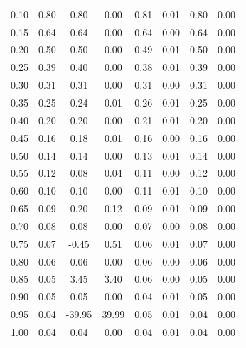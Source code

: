 \documentclass[12pt, a4paper, oneside]{article}
\begin{document}
\begin{longtable}{|c|c||c|c||c|c||c|c|}
    0.10 & 0.80 & 0.80 & 0.00 & 0.81 & 0.01 & 0.80 & 0.00 \\
    0.15 & 0.64 & 0.64 & 0.00 & 0.64 & 0.00 & 0.64 & 0.00 \\
    0.20 & 0.50 & 0.50 & 0.00 & 0.49 & 0.01 & 0.50 & 0.00 \\
    0.25 & 0.39 & 0.40 & 0.00 & 0.38 & 0.01 & 0.39 & 0.00 \\
    0.30 & 0.31 & 0.31 & 0.00 & 0.31 & 0.00 & 0.31 & 0.00 \\
    0.35 & 0.25 & 0.24 & 0.01 & 0.26 & 0.01 & 0.25 & 0.00 \\
    0.40 & 0.20 & 0.20 & 0.00 & 0.21 & 0.01 & 0.20 & 0.00 \\
    0.45 & 0.16 & 0.18 & 0.01 & 0.16 & 0.00 & 0.16 & 0.00 \\
    0.50 & 0.14 & 0.14 & 0.00 & 0.13 & 0.01 & 0.14 & 0.00 \\
    0.55 & 0.12 & 0.08 & 0.04 & 0.11 & 0.00 & 0.12 & 0.00 \\
    0.60 & 0.10 & 0.10 & 0.00 & 0.11 & 0.01 & 0.10 & 0.00 \\
    0.65 & 0.09 & 0.20 & 0.12 & 0.09 & 0.01 & 0.09 & 0.00 \\
    0.70 & 0.08 & 0.08 & 0.00 & 0.07 & 0.00 & 0.08 & 0.00 \\
    0.75 & 0.07 & -0.45 & 0.51 & 0.06 & 0.01 & 0.07 & 0.00 \\
    0.80 & 0.06 & 0.06 & 0.00 & 0.06 & 0.00 & 0.06 & 0.00 \\
    0.85 & 0.05 & 3.45 & 3.40 & 0.06 & 0.00 & 0.05 & 0.00 \\
    0.90 & 0.05 & 0.05 & 0.00 & 0.04 & 0.01 & 0.05 & 0.00 \\
    0.95 & 0.04 & -39.95 & 39.99 & 0.05 & 0.01 & 0.04 & 0.00 \\
    1.00 & 0.04 & 0.04 & 0.00 & 0.04 & 0.01 & 0.04 & 0.00 \\

\end{longtable}
\end{document}

